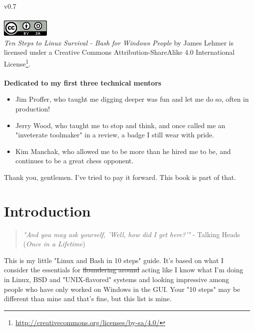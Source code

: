 \documentclass[10pt,american,]{book}
\renewcommand{\href}[2]{#2\footnote{\url{#1}}}
\numberwithin{figure}{chapter}
\begin{document}
 v0.7 ~\\
\hspace*{0.333em}\\
 \includegraphics{./images/cc-by-sa.png}\\
\emph{Ten Steps to Linux Survival - Bash for Windows People} by James
Lehmer is licensed under a
\href{http://creativecommons.org/licenses/by-sa/4.0/}{Creative Commons
Attribution-ShareAlike 4.0 International License}. ~\\
\hspace*{0.333em}\\
 \textbf{Dedicated to my first three technical mentors}

\begin{itemize}
\item
  Jim Proffer, who taught me digging deeper was fun and let me do so,
  often in production!
\item
  Jerry Wood, who taught me to stop and think, and once called me an
  "inveterate toolmaker" in a review, a badge I still wear with pride.
\item
  Kim Manchak, who allowed me to be more than he hired me to be, and
  continues to be a great chess opponent.
\end{itemize}

Thank you, gentlemen. I've tried to pay it forward. This book is part of
that.

\pagestyle{fancy} \fancyhead{}
\fancyhead[RO]{\slshape \leftmark} \renewcommand{\headrulewidth}{0.4pt}

\hypertarget{introduction}{\chapter{Introduction}\label{introduction}}

\begin{quote}
\emph{"And you may ask yourself, 'Well, how did I get here?'"} - Talking
Heads (\emph{Once in a Lifetime})
\end{quote}

This is my little "Linux and Bash in 10 steps" guide. It's based on what
I consider the essentials for \sout{floundering around} acting like I
know what I'm doing in Linux, BSD and "UNIX-flavored" systems and
looking impressive among people who have only worked on Windows in the
GUI. Your "10 steps" may be different than mine and that's fine, but
this list is mine.
\end{document}
